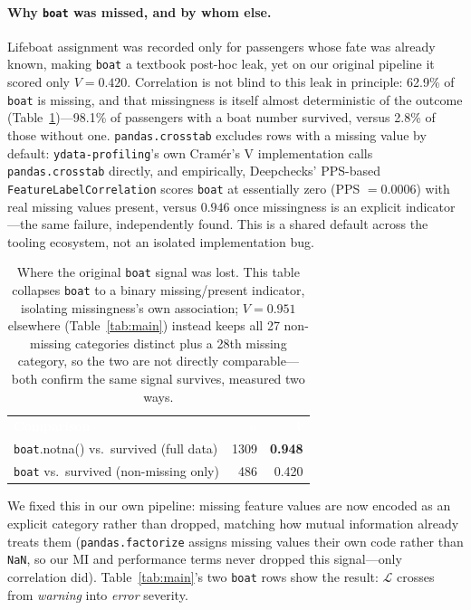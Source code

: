 \documentclass[sigconf,anonymous=false]{acmart}
\begin{document}
\paragraph{Why \texttt{boat} was missed, and by whom else.}
Lifeboat assignment was recorded only for passengers whose fate was already
known, making \texttt{boat} a textbook post-hoc leak, yet on our original
pipeline it scored only $V=0.420$. Correlation is not blind to this leak
in principle: 62.9\% of \texttt{boat} is missing, and that missingness is
itself almost deterministic of the outcome (Table~\ref{tab:missing})---98.1\%
of passengers with a boat number survived, versus 2.8\% of those without
one. \texttt{pandas.crosstab} excludes rows with a missing value by
default: \texttt{ydata-profiling}'s own Cram\'er's V implementation calls
\texttt{pandas.crosstab} directly, and empirically, Deepchecks' PPS-based
\texttt{FeatureLabelCorrelation} scores \texttt{boat} at essentially zero
(PPS $=0.0006$) with real missing values present, versus $0.946$ once
missingness is an explicit indicator---the same failure, independently
found. This is a shared default across the tooling ecosystem, not an
isolated implementation bug.

\begin{table}[h]
\centering
\caption{Where the original \texttt{boat} signal was lost. This table
  collapses \texttt{boat} to a binary missing/present indicator, isolating
  missingness's own association; $V=0.951$ elsewhere (Table~\ref{tab:main})
  instead keeps all 27 non-missing categories distinct plus a 28th missing
  category, so the two are not directly comparable---both confirm the same
  signal survives, measured two ways.}
\label{tab:missing}
\small
\begin{tabular}{lrr}
\toprule
\rowcolor{diagAccent}
\textcolor{white}{\textbf{Comparison}} & \textcolor{white}{$n$} & \textcolor{white}{$V$} \\
\texttt{boat}.notna() vs.\ survived (full data) & 1309 & \textbf{0.948} \\
\rowcolor{flagRedSoft}
\texttt{boat} vs.\ survived (non-missing only) & 486 & 0.420 \\
\bottomrule
\end{tabular}
\end{table}

We fixed this in our own pipeline: missing feature values are now encoded
as an explicit category rather than dropped, matching how mutual
information already treats them (\texttt{pandas.factorize} assigns missing
values their own code rather than \texttt{NaN}, so our MI and performance
terms never dropped this signal---only correlation did). Table~\ref{tab:main}'s
two \texttt{boat} rows show the result: $\mathcal{L}$ crosses from
\emph{warning} into \emph{error} severity.
\end{document}
